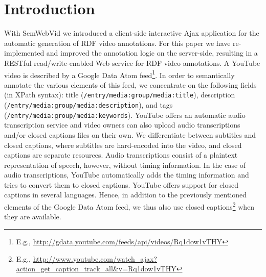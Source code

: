 \documentclass{acm_proc_article-sp}
\begin{document}



\section{Introduction}\label{sec:introduction}
With SemWebVid \cite{Steiner:SemWebVid} we introduced a client-side interactive Ajax application for the automatic generation of RDF video annotations. For this paper we have re-implemented and improved the annotation logic on the server-side, resulting in a RESTful read/write-enabled Web service for RDF video annotations. A YouTube video is described by a Google Data Atom feed\footnote{E.g., \url{http://gdata.youtube.com/feeds/api/videos/Rq1dow1vTHY}}. In order to semantically annotate the various elements of this feed, we concentrate on the following fields (in XPath syntax): title ({\tt /entry/media:group/media:title}), description ({\tt /entry/media:group/media:description}), and tags ({\tt /entry/media:group/media:keywords}). YouTube offers an automatic audio transcription service and video owners can also upload audio transcriptions and/or closed captions files on their own. We differentiate between subtitles and closed captions, where subtitles are hard-encoded into the video, and closed captions are separate resources. Audio transcriptions consist of a plaintext representation of speech, however, without timing information. In the case of audio transcriptions, YouTube automatically adds the timing information and tries to convert them to closed captions. YouTube offers support for closed captions in several languages. Hence, in addition to the previously mentioned elements of the Google Data Atom feed, we thus also use closed captions\footnote{E.g., \url{http://www.youtube.com/watch_ajax?action_get_caption_track_all&v=Rq1dow1vTHY}} when they are available.
\end{document}
